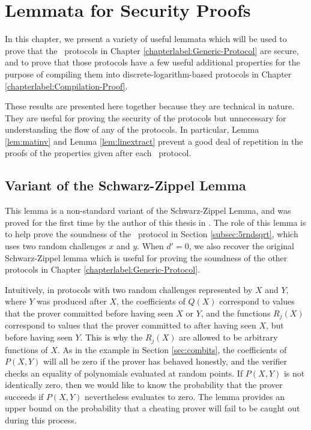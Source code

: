 \chapter{Lemmata for Security Proofs}
\label{chapterlabel:AlgIntProofs}

In this chapter, we present a variety of useful lemmata which will be used to prove that the \ILC\ protocols in Chapter \ref{chapterlabel:Generic-Protocol} are secure, and to prove that those protocols have a few useful additional properties for the purpose of compiling them into discrete-logarithm-based protocols in Chapter \ref{chapterlabel:Compilation-Proof}.

These results are presented here together because they are technical in nature. They are useful for proving the security of the protocols but unnecessary for understanding the flow of any of the protocols. In particular, Lemma \ref{lem:matinv} and Lemma \ref{lem:linextract} prevent a good deal of repetition in the proofs of the properties given after each \ILC\ protocol.

\section{Variant of the Schwarz-Zippel Lemma}

This lemma is a non-standard variant of the Schwarz-Zippel Lemma, and was proved for the first time by the author of this thesis in \cite{BootleCGGHJ17}. The role of this lemma is to help prove the soundness of the \ILC\ protocol in Section \ref{subsec:5rndsqrt}, which uses two random challenges $x$ and $y$. When $d' = 0$, we also recover the original Schwarz-Zippel lemma which is useful for proving the soundness of the other protocols in Chapter \ref{chapterlabel:Generic-Protocol}.

Intuitively, in protocols with two random challenges represented by $X$ and $Y$, where $Y$ was produced after $X$, the coefficients of $Q(X)$ correspond to values that the prover committed before having seen $X$ or $Y$, and the functions $R_j(X)$ correspond to values that the prover committed to after having seen $X$, but before having seen $Y$. This is why the $R_j(X)$ are allowed to be arbitrary functions of $X$. As in the example in Section \ref{sec:combits}, the coefficients of $P(X,Y)$ will all be zero if the prover has behaved honestly, and the verifier checks an equality of polynomials evaluated at random points. If $P(X,Y)$ is not identically zero, then we would like to know the probability that the prover succeeds if $P(X,Y)$ nevertheless evaluates to zero. The lemma provides an upper bound on the probability that a cheating prover will fail to be caught out during this process.

